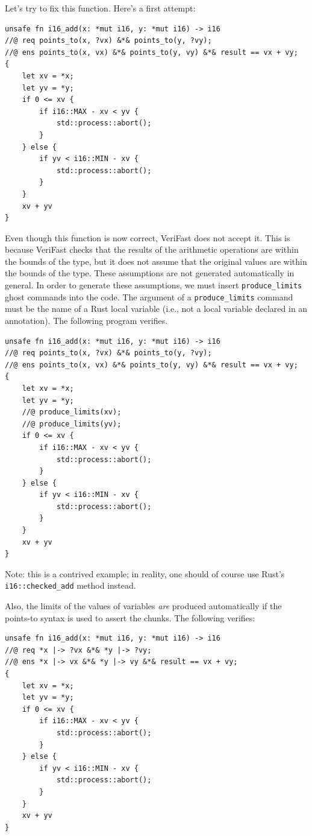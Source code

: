 \documentclass{article}
\begin{document}
Let's try to fix this function. Here's a first attempt:
\begin{lstlisting}
unsafe fn i16_add(x: *mut i16, y: *mut i16) -> i16
//@ req points_to(x, ?vx) &*& points_to(y, ?vy);
//@ ens points_to(x, vx) &*& points_to(y, vy) &*& result == vx + vy;
{
    let xv = *x;
    let yv = *y;
    if 0 <= xv {
        if i16::MAX - xv < yv {
            std::process::abort();
        }
    } else {
        if yv < i16::MIN - xv {
            std::process::abort();
        }
    }
    xv + yv
}
\end{lstlisting}
Even though this function is now correct,
VeriFast does not accept it. This is because VeriFast checks
that the results of the arithmetic operations are within the
bounds of the type, but it does not assume that the original
values are within the bounds of the type. These assumptions are
not generated automatically in general. In order to generate these assumptions, we must insert
\lstinline!produce_limits! ghost commands into the code. The
argument of a \lstinline!produce_limits! command must be the
name of a Rust local variable (i.e., not a local variable declared
in an annotation). The following program verifies.
\begin{lstlisting}
unsafe fn i16_add(x: *mut i16, y: *mut i16) -> i16
//@ req points_to(x, ?vx) &*& points_to(y, ?vy);
//@ ens points_to(x, vx) &*& points_to(y, vy) &*& result == vx + vy;
{
    let xv = *x;
    let yv = *y;
    //@ produce_limits(xv);
    //@ produce_limits(yv);
    if 0 <= xv {
        if i16::MAX - xv < yv {
            std::process::abort();
        }
    } else {
        if yv < i16::MIN - xv {
            std::process::abort();
        }
    }
    xv + yv
}
\end{lstlisting}

Note: this is a contrived example; in reality, one should of course use Rust's \lstinline|i16::checked_add| method instead.

Also, the limits of the values of variables \emph{are} produced automatically if the points-to syntax is used to assert the chunks. The following verifies:
\begin{lstlisting}
unsafe fn i16_add(x: *mut i16, y: *mut i16) -> i16
//@ req *x |-> ?vx &*& *y |-> ?vy;
//@ ens *x |-> vx &*& *y |-> vy &*& result == vx + vy;
{
    let xv = *x;
    let yv = *y;
    if 0 <= xv {
        if i16::MAX - xv < yv {
            std::process::abort();
        }
    } else {
        if yv < i16::MIN - xv {
            std::process::abort();
        }
    }
    xv + yv
}
\end{lstlisting}
\end{document}
